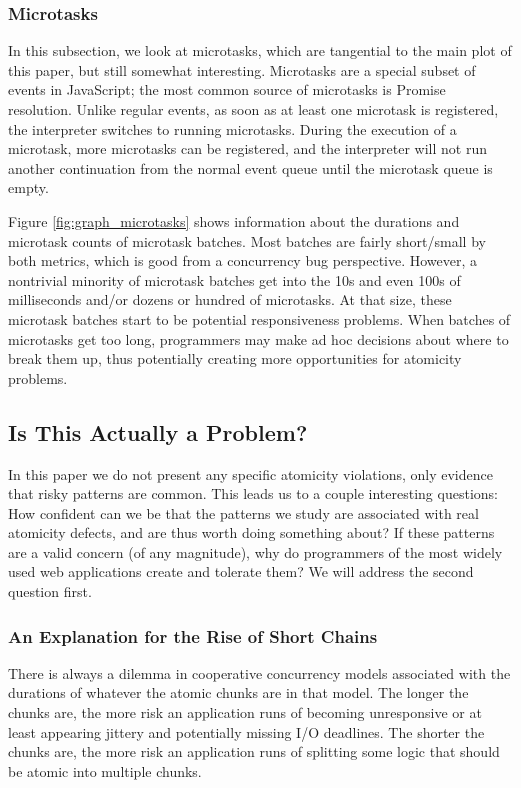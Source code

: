 \documentclass[acmsmall,anonymous,review]{acmart}\settopmatter{printfolios=true,printccs=false,printacmref=false}
\begin{document}
\subsubsection{Microtasks}

In this subsection, we look at microtasks, which are tangential to the main plot of this paper, but still somewhat interesting.
Microtasks are a special subset of events in JavaScript; the most common source of microtasks is Promise resolution.
Unlike regular events, as soon as at least one microtask is registered, the interpreter switches to running microtasks.
During the execution of a microtask, more microtasks can be registered, and the interpreter will not run another continuation from the normal event queue until the microtask queue is empty.

Figure \ref{fig:graph_microtasks} shows information about the durations and microtask counts of microtask batches.
Most batches are fairly short/small by both metrics, which is good from a concurrency bug perspective.
However, a nontrivial minority of microtask batches get into the 10s and even 100s of milliseconds and/or dozens or hundred of microtasks.
At that size, these microtask batches start to be potential responsiveness problems.
When batches of microtasks get too long, programmers may make ad hoc decisions about where to break them up, thus potentially creating more opportunities for atomicity problems.

\subsection{Is This Actually a Problem?}

In this paper we do not present any specific atomicity violations, only evidence that risky patterns are common.
This leads us to a couple interesting questions:
How confident can we be that the patterns we study are associated with real atomicity defects, and are thus worth doing something about?
If these patterns are a valid concern (of any magnitude), why do programmers of the most widely used web applications create and tolerate them?
We will address the second question first.

\subsubsection{An Explanation for the Rise of Short Chains}

There is always a dilemma in cooperative concurrency models associated with the durations of whatever the atomic chunks are in that model.
The longer the chunks are, the more risk an application runs of becoming unresponsive or at least appearing jittery and potentially missing I/O deadlines.
The shorter the chunks are, the more risk an application runs of splitting some logic that should be atomic into multiple chunks.
\end{document}
